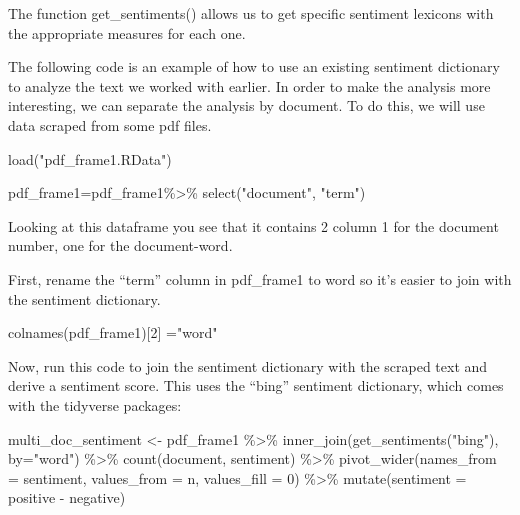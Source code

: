 \documentclass[
  letterpaper,
  DIV=11,
  numbers=noendperiod]{scrartcl}
\newenvironment{Shaded}{\begin{snugshade}}{\end{snugshade}}
\newcommand{\AttributeTok}[1]{\textcolor[rgb]{0.40,0.45,0.13}{#1}}
\newcommand{\DecValTok}[1]{\textcolor[rgb]{0.68,0.00,0.00}{#1}}
\newcommand{\FunctionTok}[1]{\textcolor[rgb]{0.28,0.35,0.67}{#1}}
\newcommand{\NormalTok}[1]{\textcolor[rgb]{0.00,0.23,0.31}{#1}}
\newcommand{\OtherTok}[1]{\textcolor[rgb]{0.00,0.23,0.31}{#1}}
\newcommand{\SpecialCharTok}[1]{\textcolor[rgb]{0.37,0.37,0.37}{#1}}
\newcommand{\StringTok}[1]{\textcolor[rgb]{0.13,0.47,0.30}{#1}}
\begin{document}
The function get\_sentiments() allows us to get specific sentiment
lexicons with the appropriate measures for each one.

The following code is an example of how to use an existing sentiment
dictionary to analyze the text we worked with earlier. In order to make
the analysis more interesting, we can separate the analysis by document.
To do this, we will use data scraped from some pdf files.

\begin{Shaded}
\begin{Highlighting}[]
\FunctionTok{load}\NormalTok{(}\StringTok{"pdf\_frame1.RData"}\NormalTok{)}

\NormalTok{pdf\_frame1}\OtherTok{=}\NormalTok{pdf\_frame1}\SpecialCharTok{\%\textgreater{}\%}
  \FunctionTok{select}\NormalTok{(}\StringTok{"document"}\NormalTok{, }\StringTok{"term"}\NormalTok{)}
\end{Highlighting}
\end{Shaded}

Looking at this dataframe you see that it contains 2 column 1 for the
document number, one for the document-word.

First, rename the ``term'' column in pdf\_frame1 to word so it's easier
to join with the sentiment dictionary.

\begin{Shaded}
\begin{Highlighting}[]
\FunctionTok{colnames}\NormalTok{(pdf\_frame1)[}\DecValTok{2}\NormalTok{] }\OtherTok{=}\StringTok{"word"}
\end{Highlighting}
\end{Shaded}

Now, run this code to join the sentiment dictionary with the scraped
text and derive a sentiment score. This uses the ``bing'' sentiment
dictionary, which comes with the tidyverse packages:

\begin{Shaded}
\begin{Highlighting}[]
\NormalTok{multi\_doc\_sentiment }\OtherTok{\textless{}{-}}\NormalTok{ pdf\_frame1 }\SpecialCharTok{\%\textgreater{}\%}
  \FunctionTok{inner\_join}\NormalTok{(}\FunctionTok{get\_sentiments}\NormalTok{(}\StringTok{"bing"}\NormalTok{), }\AttributeTok{by=}\StringTok{"word"}\NormalTok{) }\SpecialCharTok{\%\textgreater{}\%}
  \FunctionTok{count}\NormalTok{(document, sentiment) }\SpecialCharTok{\%\textgreater{}\%}
  \FunctionTok{pivot\_wider}\NormalTok{(}\AttributeTok{names\_from =}\NormalTok{ sentiment, }\AttributeTok{values\_from =}\NormalTok{ n, }\AttributeTok{values\_fill =} \DecValTok{0}\NormalTok{) }\SpecialCharTok{\%\textgreater{}\%} 
  \FunctionTok{mutate}\NormalTok{(}\AttributeTok{sentiment =}\NormalTok{ positive }\SpecialCharTok{{-}}\NormalTok{ negative)}
\end{Highlighting}
\end{Shaded}
\end{document}
